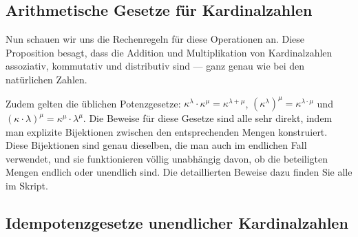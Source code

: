 \subsection{Arithmetische Gesetze für Kardinalzahlen}

\begin{spoken-clean}[01:18:55 - 01:20:55]
Nun schauen wir uns die Rechenregeln für diese Operationen an. Diese Proposition besagt, dass die Addition und Multiplikation von Kardinalzahlen assoziativ, kommutativ und distributiv sind --- ganz genau wie bei den natürlichen Zahlen.

Zudem gelten die üblichen Potenzgesetze: $\kappa^\lambda \cdot \kappa^\mu = \kappa^{\lambda + \mu}$, $(\kappa^\lambda)^\mu = \kappa^{\lambda \cdot \mu}$ und $(\kappa \cdot \lambda)^\mu = \kappa^\mu \cdot \lambda^\mu$. Die Beweise für diese Gesetze sind alle sehr direkt, indem man explizite Bijektionen zwischen den entsprechenden Mengen konstruiert. Diese Bijektionen sind genau dieselben, die man auch im endlichen Fall verwendet, und sie funktionieren völlig unabhängig davon, ob die beteiligten Mengen endlich oder unendlich sind. Die detaillierten Beweise dazu finden Sie alle im Skript.
\end{spoken-clean}

\begin{math-stroke}
\end{math-stroke}

\subsection{Idempotenzgesetze unendlicher Kardinalzahlen}

